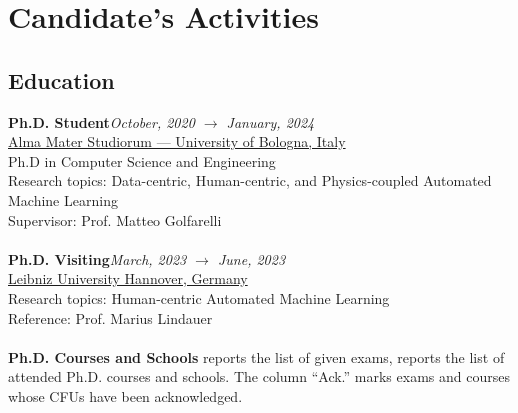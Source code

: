 \section*{Candidate's Activities}

\subsection*{Education}

\textbf{Ph.D. Student}\hfill \textit{October, 2020 $\rightarrow$ January, 2024}\\
\underline{Alma Mater Studiorum --- University of Bologna, Italy}\\
Ph.D in Computer Science and Engineering\\
Research topics: Data-centric, Human-centric, and Physics-coupled Automated Machine Learning\\
Supervisor: Prof. Matteo Golfarelli\\
\\
\textbf{Ph.D. Visiting}\hfill \textit{March, 2023 $\rightarrow$ June, 2023}\\
\underline{Leibniz University Hannover, Germany}\\
Research topics: Human-centric Automated Machine Learning\\
Reference: Prof. Marius Lindauer\\
\\
\textbf{Ph.D. Courses and Schools}
 reports the list of given exams,  reports the list of attended Ph.D. courses and schools.
The column ``Ack.'' marks exams and courses whose CFUs  have been acknowledged.
\renewcommand{\arraystretch}{1.3}
